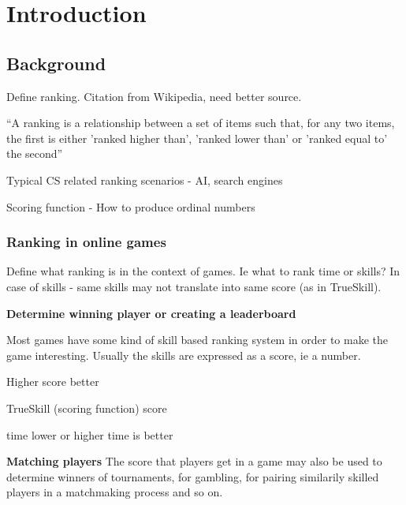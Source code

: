 \chapter{Introduction}

\section{Background}

\begin{shaded}
  Define ranking. Citation from Wikipedia, need better source.
\end{shaded}
``A ranking is a relationship between a set of items such that, for any two items, the first is either 'ranked higher than', 'ranked lower than' or 'ranked equal to' the second''

\begin{shaded}
  Typical CS related ranking scenarios - AI, search engines
\end{shaded}
 



\begin{shaded}
  Scoring function - How to produce ordinal numbers 
\end{shaded}

\subsection{Ranking in online games}

\begin{shaded}
Define what ranking is in the context of games. Ie what to rank time or skills? In case of skills - same skills may not translate into same score (as in TrueSkill). 

\end{shaded}

\textbf{Determine winning player or creating a leaderboard}

Most games have some kind of skill based ranking system in order to make the game interesting. Usually the skills are expressed as a score, ie a number.


Higher score \ra better

TrueSkill (scoring function) \ra score

time \ra lower or higher time is better

\textbf{Matching players}
The score that players get in a game may also be used to determine winners of tournaments, for gambling, for pairing similarily skilled players in a matchmaking process and so on.

